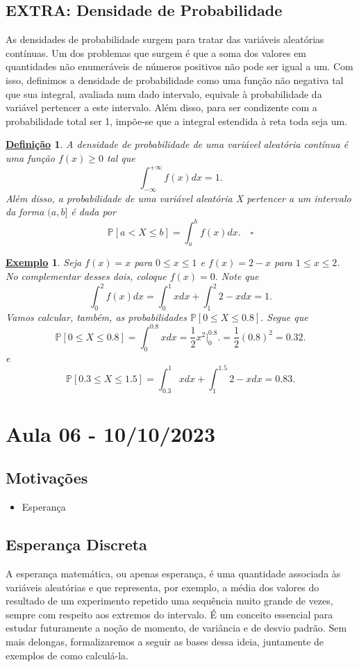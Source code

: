 \documentclass{article}
\newtheorem*{def*}{\underline{Defini\c c\~ao}}
\newtheorem{example}{\underline{Exemplo}}
\begin{document}
\subsection{EXTRA: Densidade de Probabilidade}
  As densidades de probabilidade surgem para tratar das variáveis aleatórias contínuas. Um dos problemas 
que surgem é que a soma dos valores em quantidades não enumeráveis de números positivos não pode ser igual a um.
  Com isso, definimos a densidade de probabilidade como uma função não negativa tal que sua integral, avaliada
num dado intervalo, equivale à probabilidade da variável pertencer a este intervalo. Além disso, para ser condizente com
a probabilidade total ser 1, impõe-se que a integral estendida à reta toda seja um.
\begin{def*}
  A densidade de probabilidade de uma variável aleatória contínua é uma função \(f(x)\geq 0\) tal que 
    \[
      \int_{-\infty}^{+\infty}f(x)dx = 1.
    \]
Além disso, a probabilidade de uma variável aleatória X pertencer a um intervalo da forma \((a, b]\) é dada por 
  \[
    \mathbb{P}[a < X\leq b] = \int_{a}^{b}f(x)dx.\quad \square
  \]
\end{def*}
\begin{example}
  Seja \(f(x) = x\) para \(0\leq x\leq 1\) e \(f(x) = 2 - x\) para \(1\leq x\leq 2\). No complementar desses dois,
coloque \(f(x)=0.\) Note que 
  \[
    \int_{0}^{2}f(x)dx = \int_{0}^{1}xdx + \int_{1}^{2}2-xdx = 1.
  \]
  Vamos calcular, também, as probabilidades \(\mathbb{P}[0\leq X\leq 0.8].\) Segue que 
    \[
      \mathbb{P}[0\leq X\leq 0.8]=\int_{0}^{0.8}xdx = \frac{1}{2}x^{2}\biggl|_{0}^{0.8}\biggr. = \frac{1}{2}(0.8)^{2} = 0.32.
    \]
  e 
    \[
      \mathbb{P}[0.3\leq X\leq 1.5] = \int_{0.3}^{1}xdx + \int_{1}^{1.5}2-xdx = 0.83.
    \]
\end{example}
\newpage

\section{Aula 06 - 10/10/2023}
\subsection{Motivações}
\begin{itemize}
  \item Esperança
\end{itemize}
\subsection{Esperança Discreta}
  A esperança matemática, ou apenas esperança, é uma quantidade associada às variáveis aleatórias e que representa,
por exemplo, a média dos valores do resultado de um experimento repetido uma sequência muito grande de vezes, sempre com
respeito aos extremos do intervalo. É um conceito essencial para estudar futuramente a noção de momento, de variância e de desvio padrão.
Sem mais delongas, formalizaremos a seguir as bases dessa ideia, juntamente de exemplos de como calculá-la.
  
\end{document}
